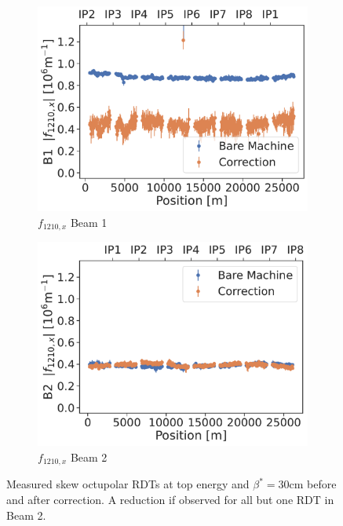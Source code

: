 \begin{figure}[!htb]
\begin{subfigure}{0.49\textwidth}
        \includegraphics[width=\textwidth]{./images/f1210_b1.pdf}
        \caption{$f_{1210,x}$ Beam 1}
    \end{subfigure}
    \hfill
    \begin{subfigure}{0.49\textwidth}
        \includegraphics[width=\textwidth]{./images/f1210_b2.pdf}
        \caption{$f_{1210,x}$ Beam 2}
    \end{subfigure}
    \caption{Measured skew octupolar RDTs at top energy and $\beta^*=30\text{cm}$ before and after
    correction. A reduction if observed for all but one RDT in Beam 2.} 
    \label{fig:skew_octupolar:corrections_vs_bare}
\end{figure}






